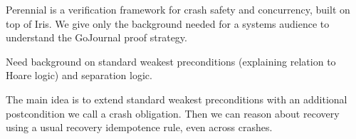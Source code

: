 
Perennial is a verification framework for crash safety and concurrency, built on
top of Iris. We give only the background needed for a systems audience to
understand the GoJournal proof strategy.

Need background on standard weakest preconditions (explaining relation to Hoare
logic) and separation logic.

The main idea is to extend standard weakest preconditions with an additional
postcondition we call a crash obligation. Then we can reason about recovery
using a usual recovery idempotence rule, even across crashes.

